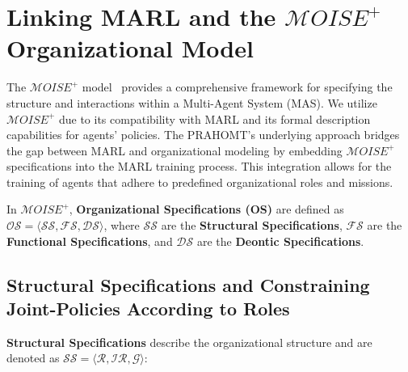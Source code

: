 \documentclass[conference]{IEEEtran}
\begin{document}


\section{Linking MARL and the $\mathcal{M}OISE^+$ Organizational Model}
\label{sec:marl_moise_linking}

The $\mathcal{M}OISE^+$ model~\cite{Hubner2007} provides a comprehensive framework for specifying the structure and interactions within a Multi-Agent System (MAS). We utilize $\mathcal{M}OISE^+$ due to its compatibility with MARL and its formal description capabilities for agents' policies. The PRAHOMT's underlying approach bridges the gap between MARL and organizational modeling by embedding $\mathcal{M}OISE^+$ specifications into the MARL training process. This integration allows for the training of agents that adhere to predefined organizational roles and missions.

In $\mathcal{M}OISE^+$, \textbf{Organizational Specifications (OS)} are defined as $\mathcal{OS} = \langle \mathcal{SS}, \mathcal{FS}, \mathcal{DS} \rangle$, where $\mathcal{SS}$ are the \textbf{Structural Specifications}, $\mathcal{FS}$ are the \textbf{Functional Specifications}, and $\mathcal{DS}$ are the \textbf{Deontic Specifications}.

\subsection{Structural Specifications and Constraining Joint-Policies According to Roles}

\textbf{Structural Specifications} describe the organizational structure and are denoted as $\mathcal{SS} = \langle \mathcal{R}, \mathcal{IR}, \mathcal{G} \rangle$:
\end{document}

